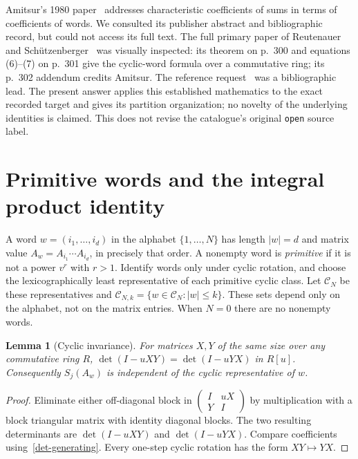 \documentclass[11pt]{article}
\newtheorem{lemma}[theorem]{Lemma}
\begin{document}
Amitsur's 1980 paper~\cite{amitsur} addresses characteristic coefficients
of sums in terms of coefficients of words. We consulted its publisher
abstract and bibliographic record, but could not access its full text.
The full primary paper of Reutenauer and Sch\"utzenberger~\cite{rs} was
visually inspected: its theorem on p.~300 and equations (6)--(7) on p.~301
give the cyclic-word formula over a commutative ring; its p.~302 addendum
credits Amitsur. The reference request~\cite{mo} was a bibliographic lead.
The present answer applies this established mathematics to the exact
recorded target and gives its partition organization; no novelty of the
underlying identities is claimed. This does not revise the catalogue's
original \texttt{open} source label.

\section{Primitive words and the integral product identity}
A word $w=(i_1,\ldots,i_d)$ in the alphabet $\{1,\ldots,N\}$ has length
$|w|=d$ and matrix value
$A_w=A_{i_1}\cdots A_{i_d}$, in precisely that order.
A nonempty word is \emph{primitive} if it is not a power $v^r$ with $r>1$.
Identify words only under cyclic rotation, and choose the lexicographically
least representative of each primitive cyclic class. Let $\mathcal C_N$
be these representatives and
$\mathcal C_{N,k}=\{w\in\mathcal C_N:|w|\leq k\}$.
These sets depend only on the alphabet, not on the matrix entries.
When $N=0$ there are no nonempty words.

\begin{lemma}[Cyclic invariance]\label{cyclic}
For matrices $X,Y$ of the same size over any commutative ring $R$,
$\det(I-uXY)=\det(I-uYX)$ in $R[u]$. Consequently $S_j(A_w)$
is independent of the cyclic representative of $w$.
\end{lemma}
\begin{proof}
Eliminate either off-diagonal block in
$\left(\begin{smallmatrix}I&uX\\Y&I\end{smallmatrix}\right)$
by multiplication with a block triangular matrix with identity diagonal
blocks. The two resulting determinants are $\det(I-uXY)$ and
$\det(I-uYX)$. Compare coefficients using~\eqref{det-generating}.
Every one-step cyclic rotation has the form $XY\mapsto YX$.
\end{proof}
\end{document}
